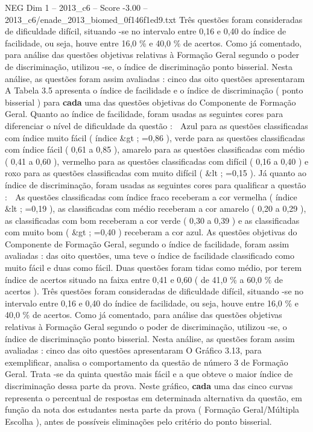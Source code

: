 \begin{textsample}{NEG Dim 1 – 2013\_c6 – Score -3.00 – 2013\_c6/enade\_2013\_biomed\_0f146f1ed9.txt}
Três questões foram consideradas de dificuldade difícil, situando -se no intervalo entre 0,16 e 0,40 do índice de facilidade, ou seja, houve entre 16,0 \% e 40,0 \% de acertos.
Como já comentado, para análise das questões objetivas relativas à Formação Geral segundo o poder de discriminação, utilizou -se, o índice de discriminação ponto bisserial.
Nesta análise, as questões foram assim avaliadas : cinco das oito questões apresentaram A Tabela 3.5 apresenta o índice de facilidade e o índice de discriminação ( ponto bisserial ) para \textbf{cada} uma das questões objetivas do Componente de Formação Geral.
Quanto ao índice de facilidade, foram usadas as seguintes cores para diferenciar o nível de dificuldade da questão :  Azul para as questões classificadas com índice muito fácil ( índice \&gt ; =0,86 ), verde para as questões classificadas com índice fácil ( 0,61 a 0,85 ), amarelo para as questões classificadas com médio ( 0,41 a 0,60 ), vermelho para as questões classificadas com difícil ( 0,16 a 0,40 ) e roxo para as questões classificadas com muito difícil ( \&lt ; =0,15 ).
Já quanto ao índice de discriminação, foram usadas as seguintes cores para qualificar a questão :  As questões classificadas com índice fraco receberam a cor vermelha ( índice \&lt ; =0,19 ), as classificadas com médio receberam a cor amarelo ( 0,20 a 0,29 ), as classificadas com bom receberam a cor verde ( 0,30 a 0,39 ) e as classificadas com muito bom ( \&gt ; =0,40 ) receberam a cor azul.
As questões objetivas do Componente de Formação Geral, segundo o índice de facilidade, foram assim avaliadas : das oito questões, uma teve o índice de facilidade classificado como muito fácil e duas como fácil.
Duas questões foram tidas como médio, por terem índice de acertos situado na faixa entre 0,41 e 0,60 ( de 41,0 \% a 60,0 \% de acertos ).
Três questões foram consideradas de dificuldade difícil, situando -se no intervalo entre 0,16 e 0,40 do índice de facilidade, ou seja, houve entre 16,0 \% e 40,0 \% de acertos.
Como já comentado, para análise das questões objetivas relativas à Formação Geral segundo o poder de discriminação, utilizou -se, o índice de discriminação ponto bisserial.
Nesta análise, as questões foram assim avaliadas : cinco das oito questões apresentaram O Gráfico 3.13, para exemplificar, analisa o comportamento da questão de número 3 de Formação Geral.
Trata -se da quinta questão mais fácil e a que obteve o maior índice de discriminação dessa parte da prova.
Neste gráfico, \textbf{cada} uma das cinco curvas representa o percentual de respostas em determinada alternativa da questão, em função da nota dos estudantes nesta parte da prova ( Formação Geral/Múltipla Escolha ), antes de possíveis eliminações pelo critério do ponto bisserial.

\end{textsample}

